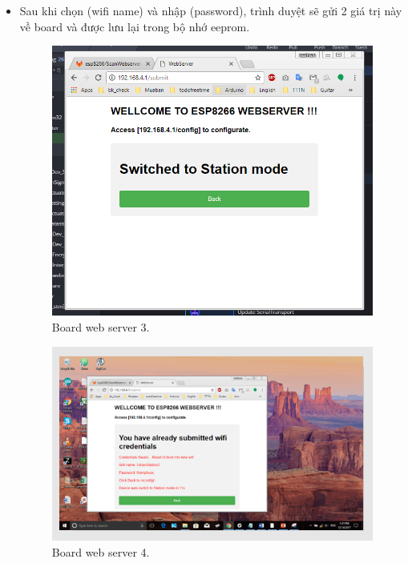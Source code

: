 \documentclass[a4paper,12pt,oneside]{article}
\begin{document}
\begin{enumerate}
\begin{itemize}
\begin{itemize}
			\item Sau khi chọn (wifi name) và nhập (password), trình duyệt sẽ gửi 2 giá trị này về board và được lưu lại trong bộ nhớ eeprom.
			\begin{figure}[H]
			\centering
			\begin{center}
			\includegraphics[scale=.7]{hinh/webserver_3.PNG}
			\end{center}
			\caption{Board web server 3.}
			\end{figure}
			
			\begin{figure}[H]
			\centering
			\begin{center}
			\includegraphics[scale=.9]{hinh/webserver_4.PNG}
			\end{center}
			\caption{Board web server 4.}
			\end{figure}
			

\end{itemize}
\end{itemize}
\end{enumerate}
\end{document}
